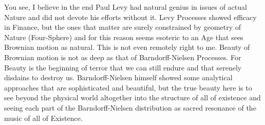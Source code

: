 \documentclass{amsart}
\begin{document}
You see, I believe in the end Paul Levy had natural genius in issues of actual Nature and did not devote his efforts without it.  Levy Processes showed efficacy in Finance, but the ones that matter are surely constrained by geometry of Nature (Four-Sphere) and for this reason seems esoteric to an Age that sees Brownian motion as natural.  This is not even remotely right to me.  Beauty of Brownian motion is not as deep as that of Barndorff-Nielsen Processes.  For Beauty is the beginning of terror that we can still endure and that serenely disdains to destroy us.  Barndorff-Nielsen himself showed some analytical approaches that are sophisticated and beautiful, but the true beauty here is to see beyond the physical world altogether into the structure of all of existence and seeing each part of the Barndorff-Nielsen distribution as sacred resonance of the music of all of Existence.  
\end{document}
